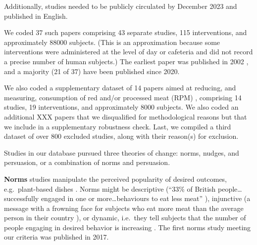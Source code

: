 \documentclass[sn-nature,pdflatex]{sn-jnl}
\begin{document}
Additionally, studies needed to be publicly circulated by December 2023
and published in English.

We coded 37 such papers
\citep{aldoh2023, allen2002, alblas2023, coker2022, griesoph2021, piester2020, sparkman2017, sparkman2020, andersson2021, kanchanachitra2020, bochmann2017, bschaden2020, cooney2016, feltz2022, haile2021, mathur2021effectiveness, peacock2017, polanco2022, sparkman2021, abrahamse2007, acharya2004, banerjee2019, berndsen2005, bertolaso2015, bianchi2022, fehrenbach2015, hatami2018, jalil2023, merrill2009, norris2014, shreedhar2021, weingarten2022, carfora2023, hennessy2016, mattson2020}
comprising 43 separate studies, 115 interventions, and approximately
88000 subjects. (This is an approximation because some interventions
were administered at the level of day or cafeteria and did not record a
precise number of human subjects.) The earliest paper was published in
2002 \citep{allen2002}, and a majority (21 of 37) have been published
since 2020.

We also coded a supplementary dataset of 14 papers aimed at reducing,
and measuring, consumption of red and/or processed meat (RPM)
\citep{carfora2017correlational, carfora2017randomised, carfora2019, carfora2019informational, delichatsios2001, dijkstra2022, emmons2005cancer, emmons2005project, jaacks2014, james2015, lee2018, perino2022, schatzkin2000, sorensen2005},
comprising 14 studies, 19 interventions, and approximately 8000
subjects. We also coded an additional XXX papers that we disqualified
for methodological reasons but that we include in a supplementary
robustness check. Last, we compiled a third dataset of over 800 excluded
studies, along with their reason(s) for exclusion.

Studies in our database pursued three theories of change: norms, nudges,
and persuasion, or a combination of norms and persuasion.

\textbf{Norms} studies
\citep{aldoh2023, allen2002, alblas2023, coker2022, griesoph2021, piester2020, sparkman2017, sparkman2020}
manipulate the perceived popularity of desired outcomes,
e.g.~plant-based dishes \citep{sparkman2017}. Norms might be descriptive
(``33\% of British people\ldots successfully engaged in one or
more\ldots behaviours to eat less meat'' \citep{aldoh2023}), injunctive
(a message with a frowning face for subjects who eat more meat than the
average person in their country \citep{alblas2023}), or dynamic,
i.e.~they tell subjects that the number of people engaging in desired
behavior is increasing
\citep{aldoh2023, coker2022, sparkman2017, sparkman2020}. The first
norms study meeting our criteria was published in 2017.
\end{document}
